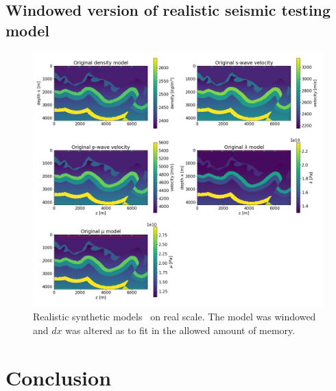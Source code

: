 \documentclass[10pt]{SelfArx} %
\theoremstyle{definition}
\begin{document}
\subsection{Windowed version of realistic seismic testing model}
\begin{figure}[!h]\label{fig:cana_real_model}
\hspace*{-0.4in}
\includegraphics[width=1.15\textwidth]{fig/cana_real_models.png}
\caption{Realistic synthetic models~\cite{Gray1995} on real scale. The model was windowed and $dx$ was altered as to fit in the allowed amount of memory.}
\end{figure}
\clearpage

\section{Conclusion}




\end{document}
